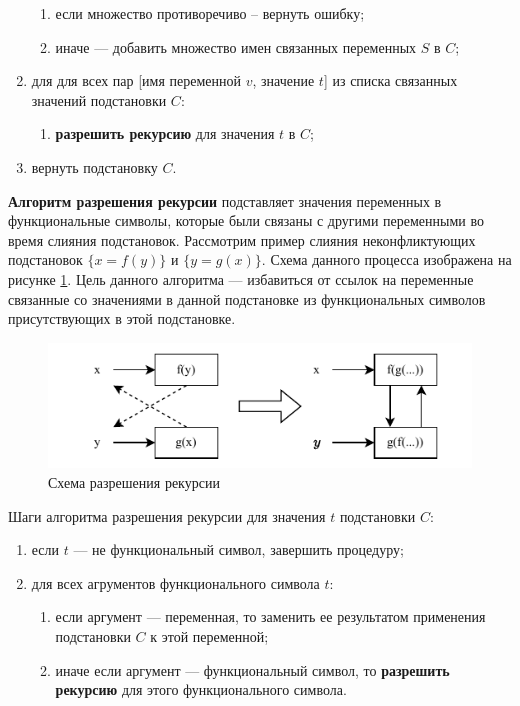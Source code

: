 \begin{enumerate}
\begin{enumerate}
        \item если множество противоречиво -- вернуть ошибку; 
        \item иначе --- добавить множество имен связанных переменных $S$ в $C$; 
    \end{enumerate}
    \item для для всех пар [имя переменной $v$, значение $t$] из списка связанных значений подстановки $C$:
    \begin{enumerate}
        \item \textbf{разрешить рекурсию} для значения $t$ в $C$;
    \end{enumerate}
    \item вернуть подстановку $C$.
\end{enumerate}

\textbf{Алгоритм разрешения рекурсии} подставляет значения переменных в функциональные символы, которые были связаны с другими переменными во время слияния подстановок. Рассмотрим пример слияния неконфликтующих подстановок $\{x = f(y)\}$ и $\{y = g(x)\}$. Схема данного процесса изображена на рисунке \ref{fig:func-rec}. Цель данного алгоритма --- избавиться от ссылок на переменные связанные со значениями в данной подстановке из функциональных символов присутствующих в этой подстановке.

\begin{figure}[h!]
    \centering
    \includegraphics[width=0.7\linewidth]{func-recursion.pdf}
    \caption{Схема разрешения рекурсии}
    \label{fig:func-rec}
\end{figure}

Шаги алгоритма разрешения рекурсии для значения $t$ подстановки $C$:

\begin{enumerate}
    \item если $t$ --- не функциональный символ, завершить процедуру;
    \item для всех агрументов функционального символа $t$:
    \begin{enumerate}
        \item если аргумент --- переменная, то заменить ее результатом применения подстановки $C$ к этой переменной;
        \item иначе если аргумент --- функциональный символ, то \textbf{разрешить рекурсию} для этого функционального символа.
    \end{enumerate}
\end{enumerate}

